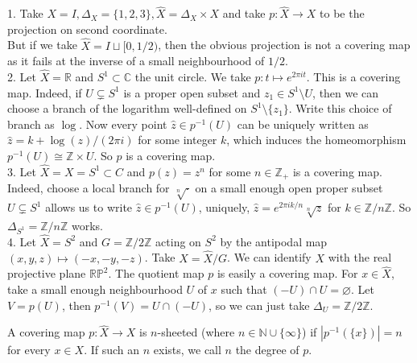 \begin{example}
    1. Take $X=I, \Delta_X=\{1,2,3\}, \hat{X}=\Delta_X\times X$ and take $p:\hat{X}\to X$ to be the projection on second coordinate.\\
    But if we take $\hat{X}=I\sqcup[0,1/2)$, then the obvious projection is not a covering map as it fails at the inverse of a small neighbourhood of $1/2$.\\
    2. Let $\hat{X}=\mathbb R$ and $S^1\subset\mathbb C$ the unit circle.
    We take $p:t\mapsto e^{2\pi it}$.
    This is a covering map.
    Indeed, if $U\subsetneq S^1$ is a proper open subset and $z_1\in S^1\setminus U$, then we can choose a branch of the logarithm well-defined on $S^1\setminus\{z_1\}$.
    Write this choice of branch as $\log$.
    Now every point $\hat{z}\in p^{-1}(U)$ can be uniquely written as $\hat{z}=k+\log(z)/(2\pi i)$ for some integer $k$, which induces the homeomorphism $p^{-1}(U)\cong\mathbb Z\times U$.
    So $p$ is a covering map.\\
    3. Let $\hat{X}=X=S^1\subset C$ and $p(z)=z^n$ for some $n\in\mathbb Z_+$ is a covering map.
    Indeed, choose a local branch for $\sqrt[n]{\cdot}$ on a small enough open proper subset $U\subsetneq S^1$ allows us to write $\hat{z}\in p^{-1}(U)$, uniquely, $\hat{z}=e^{2\pi ik/n}\sqrt[n]{z}$ for $k\in\mathbb Z/n\mathbb Z$.
    So $\Delta_{S^1}=\mathbb Z/n\mathbb Z$ works.\\
    4. Let $\hat{X}=S^2$ and $G=\mathbb Z/2\mathbb Z$ acting on $S^2$ by the antipodal map $(x,y,z)\mapsto (-x,-y,-z)$.
    Take $X=\hat{X}/G$.
    We can identify $X$ with the real projective plane $\mathbb{RP}^2$.
    The quotient map $p$ is easily a covering map.
    For $x\in\hat{X}$, take a small enough neighbourhood $U$ of $x$ such that $(-U)\cap U=\varnothing$.
    Let $V=p(U)$, then $p^{-1}(V)=U\cap(-U)$, so we can just take $\Delta_U=\mathbb Z/2\mathbb Z$.
\end{example}
\begin{definition}
    A covering map $p:\hat{X}\to X$ is $n$-sheeted (where $n\in\mathbb N\cup\{\infty\}$) if $|p^{-1}(\{x\})|=n$ for every $x\in X$.
    If such an $n$ exists, we call $n$ the degree of $p$.
\end{definition}
